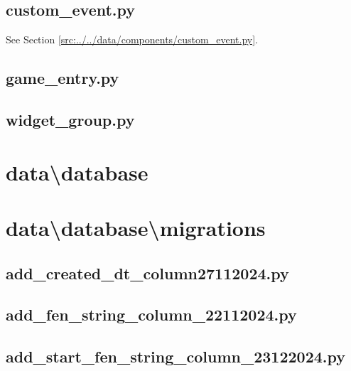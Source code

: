 \documentclass[../main/main.tex]{subfiles}
\begin{document}
\subsection{custom\_event.py}
See Section \ref{src:../../data/components/custom_event.py}.

\subsection{game\_entry.py}

\label{src:data/components/game_entry.py}

\subsection{widget\_group.py}

\label{src:data/components/widget_group.py}

\section{data\textbackslash database}
\section{data\textbackslash database\textbackslash migrations}
\subsection{add\_created\_dt\_column27112024.py}

\label{src:data/database/migrations/add_created_dt_column27112024.py}

\subsection{add\_fen\_string\_column\_22112024.py}

\label{src:data/database/migrations/add_fen_string_column_22112024.py}

\subsection{add\_start\_fen\_string\_column\_23122024.py}

\label{src:data/database/migrations/add_start_fen_string_column_23122024.py}
\end{document}
